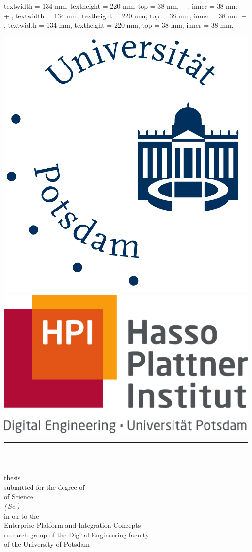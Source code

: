 
\ifprintVersion
	\ifprofessionalPrint
		\newgeometry
		{
			textwidth = 134 mm,
			textheight = 220 mm,
			top = 38 mm + \extraborderlength,
			inner = 38 mm + \mybindingcorrection + \extraborderlength,
		}
	\else
		\newgeometry
		{
			textwidth = 134 mm,
			textheight = 220 mm,
			top = 38 mm,
			inner = 38 mm + \mybindingcorrection,
		}
	\fi
\else
	\newgeometry
	{
		textwidth = 134 mm,
		textheight = 220 mm,
		top = 38 mm,
		inner = 38 mm,
	}
\fi

\begin{titlepage}
	\sffamily
	\begin{center}
		\includegraphics[height = 3.2 cm]{core/title_page/logo_UP.pdf} \hfill \includegraphics[height = 3 cm]{core/title_page/logo_HPI.pdf}\\
		\vfil
		{\LARGE
			\rule[1 ex]{\textwidth}{1.5 pt}
			\onehalfspacing\printTitleBold\\[1 ex]
			\rule[-1 ex]{\textwidth}{1 pt}
		}
		\vfil
		{\Large\textbf{\printAuthor}}
		\vfil
		{\large \colloquialDegreeName{} thesis\\[0.25 ex]
			submitted for the degree of}\\[0.25 ex]
		\bigskip
		{\Large \colloquialDegreeName{} of Science}\\[0.5 ex]
		{\large\emph{(\degreeAbbreviation\,Sc.)}}\\
		\bigskip
		{\large in
			\printProgram}
		\vfil
		{\large on \printDateReceived{} to the\\[0.25 ex]
			Enterprise Platform and Integration Concepts\\[0.25 ex]
			research group of the Digital-Engineering faculty\\[0.25 ex]
			of the University of Potsdam}
	\end{center}


\end{titlepage}
